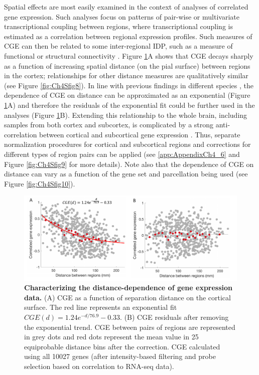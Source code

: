 Spatial effects are most easily examined in the context of analyses of correlated gene expression. Such analyses focus on patterns of pair-wise or multivariate transcriptional coupling between regions, where transcriptional coupling is estimated as a correlation between regional expression profiles. Such measures of CGE can then be related to some inter-regional IDP, such as a measure of functional or structural connectivity \citep{Richiardi2015,Fulcher2016,Arnatkeviciute2018}. Figure \ref{fig:Ch4Fig8}A shows that CGE decays sharply as a function of increasing spatial distance (on the pial surface) between regions in the cortex; relationships for other distance measures are qualitatively similar (see Figure \ref{fig:Ch4Sfig8}). In line with previous findings in different species \citep{Fulcher2016,Arnatkeviciute2018}, the dependence of CGE on distance can be approximated as an exponential (Figure \ref{fig:Ch4Fig8}A) and therefore the residuals of the exponential fit could be further used in the analyses (Figure \ref{fig:Ch4Fig8}B). Extending this relationship to the whole brain, including samples from both cortex and subcortex, is complicated by a strong anti-correlation between cortical and subcortical gene expression \citep{Hawrylycz2015}. Thus, separate normalization procedures for cortical and subcortical regions and corrections for different types of region pairs can be applied (see \ref{app:AppendixCh4_6} and Figure \ref{fig:Ch4Sfig9} for more details). Note also that the dependence of CGE on distance can vary as a function of the gene set and parcellation being used (see Figure \ref{fig:Ch4Sfig10}).

\begin{figure}[h]
  \centering
    \includegraphics[width=1\textwidth]{Chapter4/Ch4Fig8.pdf}
\caption{\textbf{Characterizing the distance-dependence of gene expression data.}
(A) CGE as a function of separation distance on the cortical surface. The red line represents an exponential fit $CGE(d) = 1.24e^{-d/76.9}-0.33$.
(B) CGE residuals after removing the exponential trend. CGE between pairs of regions are represented in grey dots and red dots represent the mean value in 25 equiprobable distance bins after the correction. CGE calculated using all \num{10027} genes (after intensity-based filtering and probe selection based on correlation to RNA-seq data).}
\label{fig:Ch4Fig8}
\end{figure}

